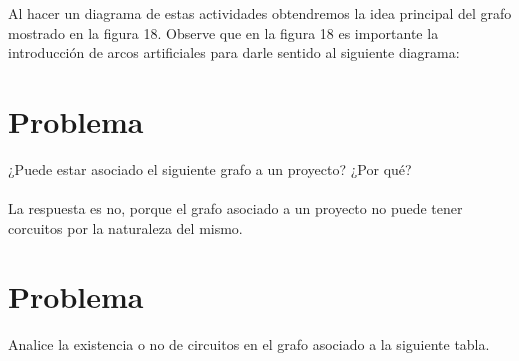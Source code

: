 \documentclass[autocontact]{gaceta}
\begin{document}
        Al hacer un diagrama de estas actividades obtendremos la idea principal del grafo mostrado en
        la figura 18. Observe que en la figura 18 es importante la introducción de arcos artificiales para darle 
        sentido al siguiente diagrama:
        


\section{Problema}
        ¿Puede estar asociado el siguiente grafo a un proyecto? ¿Por qué?\\
        \\
        La respuesta es no, porque el grafo asociado a un proyecto no puede tener 
        corcuitos por la naturaleza del mismo.


\section{Problema}
        Analice la existencia o no de circuitos en el grafo asociado a la siguiente tabla.
\end{document}

